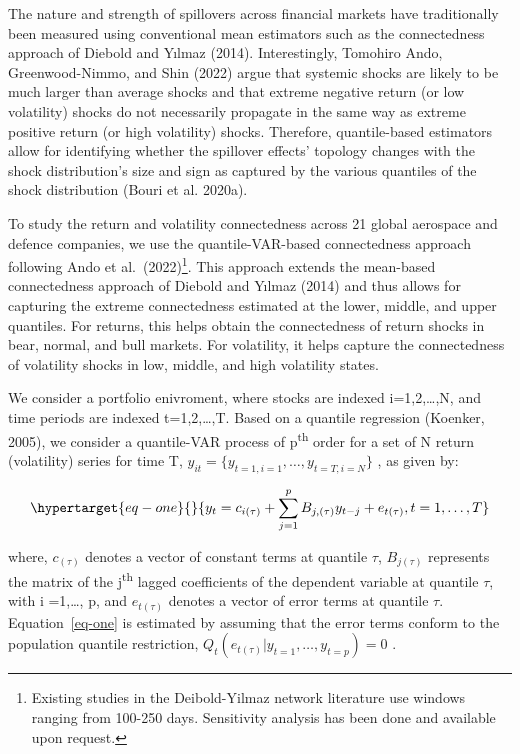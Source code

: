 \documentclass[
  letterpaper,
  DIV=11,
  numbers=noendperiod]{scrartcl}
\begin{document}
The nature and strength of spillovers across financial markets have
traditionally been measured using conventional mean estimators such as
the connectedness approach of Diebold and Yılmaz (2014). Interestingly,
Tomohiro Ando, Greenwood-Nimmo, and Shin (2022) argue that systemic
shocks are likely to be much larger than average shocks and that extreme
negative return (or low volatility) shocks do not necessarily propagate
in the same way as extreme positive return (or high volatility) shocks.
Therefore, quantile-based estimators allow for identifying whether the
spillover effects' topology changes with the shock distribution's size
and sign as captured by the various quantiles of the shock distribution
(Bouri et al. 2020a).

To study the return and volatility connectedness across 21 global
aerospace and defence companies, we use the quantile-VAR-based
connectedness approach following Ando et al.~(2022)\footnote{Existing
  studies in the Deibold-Yilmaz network literature use windows ranging
  from 100-250 days. Sensitivity analysis has been done and available
  upon request.}. This approach extends the mean-based connectedness
approach of Diebold and Yılmaz (2014) and thus allows for capturing the
extreme connectedness estimated at the lower, middle, and upper
quantiles. For returns, this helps obtain the connectedness of return
shocks in bear, normal, and bull markets. For volatility, it helps
capture the connectedness of volatility shocks in low, middle, and high
volatility states.

We consider a portfolio enivroment, where stocks are indexed
i=1,2,\ldots,N, and time periods are indexed t=1,2,\ldots,T. Based on a
quantile regression (Koenker, 2005), we consider a quantile-VAR process
of p\textsuperscript{th} order for a set of N return (volatility) series
for time T, \(y_{it}=\{y_{t=1,i=1},\dots,y_{t=T,i=N}\}\) , as given by:

\begin{equation}\protect\hypertarget{eq-one}{}{
y_{t}=c_{i(\tau)}+\sum_{j=1}^{p} B_{j,(\tau)} y_{t-j}+e_{t(\tau)}, t=1,\dots,T
}\label{eq-one}\end{equation}

where, \(c_{(\tau)}\) denotes a vector of constant terms at quantile
\(\tau\), \(B_{j(\tau)}\) represents the matrix of the
j\textsuperscript{th} lagged coefficients of the dependent variable at
quantile \(\tau\), with i =1,\ldots, p, and \(e_{t(\tau)}\) denotes a
vector of error terms at quantile \(\tau\). Equation~\ref{eq-one} is
estimated by assuming that the error terms conform to the population
quantile restriction, \(Q_t(e_{t(\tau)} |y_{t=1},\dots,y_{t=p})=0\) .
\end{document}
